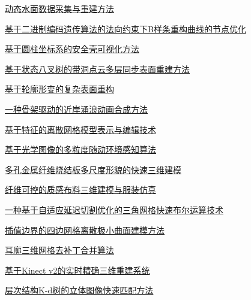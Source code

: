 \documentclass[a4paper]{article}
\begin{document}
\href{http://www.jos.org.cn/ch/reader/download_pdf.aspx?file_no=5074&year_id=2016&quarter_id=10&falg=1}{动态水面数据采集与重建方法}

\href{http://www.jos.org.cn/ch/reader/download_pdf.aspx?file_no=5076&year_id=2016&quarter_id=10&falg=1}{基于二进制编码遗传算法的法向约束下B样条重构曲线的节点优化}

\href{http://www.jos.org.cn/ch/reader/download_pdf.aspx?file_no=5077&year_id=2016&quarter_id=10&falg=1}{基于圆柱坐标系的安全壳可视化方法}

\href{http://www.jos.org.cn/ch/reader/download_pdf.aspx?file_no=5078&year_id=2016&quarter_id=10&falg=1}{基于状态八叉树的带洞点云多层同步表面重建方法}

\href{http://www.jos.org.cn/ch/reader/download_pdf.aspx?file_no=5079&year_id=2016&quarter_id=10&falg=1}{基于轮廓形变的复杂表面重构}

\href{http://www.jos.org.cn/ch/reader/download_pdf.aspx?file_no=5081&year_id=2016&quarter_id=10&falg=1}{一种骨架驱动的近岸涌浪动画合成方法}

\href{http://www.jos.org.cn/ch/reader/download_pdf.aspx?file_no=5082&year_id=2016&quarter_id=10&falg=1}{基于特征的离散网格模型表示与编辑技术}

\href{http://www.jos.org.cn/ch/reader/download_pdf.aspx?file_no=5083&year_id=2016&quarter_id=10&falg=1}{基于光学图像的多粒度随动环境感知算法}

\href{http://www.jos.org.cn/ch/reader/download_pdf.aspx?file_no=5084&year_id=2016&quarter_id=10&falg=1}{多孔金属纤维烧结板多尺度形貌的快速三维建模}

\href{http://www.jos.org.cn/ch/reader/download_pdf.aspx?file_no=5085&year_id=2016&quarter_id=10&falg=1}{纤维可控的质感布料三维建模与服装仿真}

\href{http://www.jos.org.cn/ch/reader/download_pdf.aspx?file_no=5086&year_id=2016&quarter_id=10&falg=1}{一种基于自适应延迟切割优化的三角网格快速布尔运算技术}

\href{http://www.jos.org.cn/ch/reader/download_pdf.aspx?file_no=5087&year_id=2016&quarter_id=10&falg=1}{插值边界的四边网格离散极小曲面建模方法}

\href{http://www.jos.org.cn/ch/reader/download_pdf.aspx?file_no=5088&year_id=2016&quarter_id=10&falg=1}{耳廓三维网格去补丁合并算法}

\href{http://www.jos.org.cn/ch/reader/download_pdf.aspx?file_no=5089&year_id=2016&quarter_id=10&falg=1}{基于Kinect v2的实时精确三维重建系统}

\href{http://www.jos.org.cn/ch/reader/download_pdf.aspx?file_no=5090&year_id=2016&quarter_id=10&falg=1}{层次结构K-d树的立体图像快速匹配方法}
\end{document}
